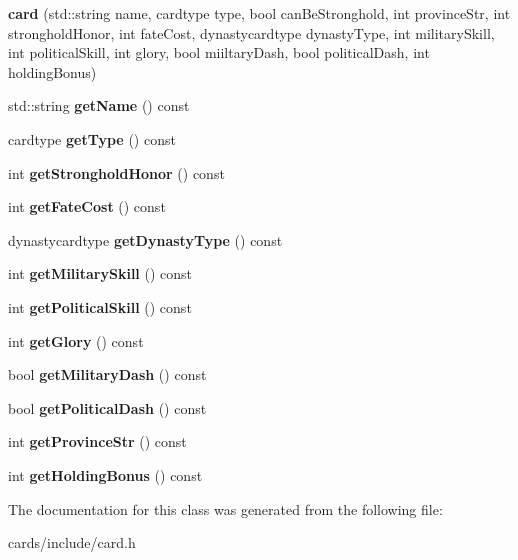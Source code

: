 \begin{DoxyCompactItemize}
\item 
\mbox{\label{classl5r_1_1card_afa31d271e8904514e963386c9354b367}} 
{\bfseries card} (std\+::string name, cardtype type, bool can\+Be\+Stronghold, int province\+Str, int stronghold\+Honor, int fate\+Cost, dynastycardtype dynasty\+Type, int military\+Skill, int political\+Skill, int glory, bool miiltary\+Dash, bool political\+Dash, int holding\+Bonus)
\item 
\mbox{\label{classl5r_1_1card_a56c808d2cc2bf4ef140692148af5c0f7}} 
std\+::string {\bfseries get\+Name} () const
\item 
\mbox{\label{classl5r_1_1card_a85c996e2be7a530523aefa7ecfebcf05}} 
cardtype {\bfseries get\+Type} () const
\item 
\mbox{\label{classl5r_1_1card_a59d756d5fe9f971f2efdbe31547a428a}} 
int {\bfseries get\+Stronghold\+Honor} () const
\item 
\mbox{\label{classl5r_1_1card_acc1f27d0848be90f08b403e1ad75708d}} 
int {\bfseries get\+Fate\+Cost} () const
\item 
\mbox{\label{classl5r_1_1card_a64b8e6b4eeb1e86d66181d14a6073ab7}} 
dynastycardtype {\bfseries get\+Dynasty\+Type} () const
\item 
\mbox{\label{classl5r_1_1card_a43ab8dba9cb6f9c66201f28cf9c29e2a}} 
int {\bfseries get\+Military\+Skill} () const
\item 
\mbox{\label{classl5r_1_1card_a169452d99e157ab802372305af9711e0}} 
int {\bfseries get\+Political\+Skill} () const
\item 
\mbox{\label{classl5r_1_1card_a65814c3b651b7302745aa8711eaca5b9}} 
int {\bfseries get\+Glory} () const
\item 
\mbox{\label{classl5r_1_1card_ace9a419fe6cb146cacd4a5f2d351b486}} 
bool {\bfseries get\+Military\+Dash} () const
\item 
\mbox{\label{classl5r_1_1card_aa4ad22c8484cb80ad5dc58742c4c9873}} 
bool {\bfseries get\+Political\+Dash} () const
\item 
\mbox{\label{classl5r_1_1card_ac06968e96c469335dad4a8ee8d069bed}} 
int {\bfseries get\+Province\+Str} () const
\item 
\mbox{\label{classl5r_1_1card_ad2fdb30a9b2429713d0788c0325941fd}} 
int {\bfseries get\+Holding\+Bonus} () const
\end{DoxyCompactItemize}


The documentation for this class was generated from the following file\+:\begin{DoxyCompactItemize}
\item 
cards/include/card.\+h\end{DoxyCompactItemize}
